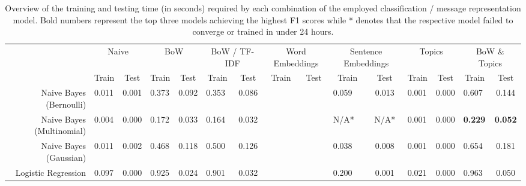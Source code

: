\documentclass[letterpaper]{article}
\begin{document}
\begin{landscape}
	\begin{table}[t!]
		\centering
		\caption{Overview of the training and testing time (in seconds) required by each combination of the employed classification / message representation model. Bold numbers represent the top three models achieving the highest F1 scores while * denotes that the respective model failed to converge or trained in under 24 hours.}
		\label{tb: time}
		\begin{tabular}{@{}r|lclclclclclclc@{}}
			\toprule
			                          & \multicolumn{2}{c}{Naive}         & \multicolumn{2}{c}{BoW}           & \multicolumn{2}{c}{BoW / TF-IDF}  & \multicolumn{2}{c}{Word Embeddings} & \multicolumn{2}{c}{Sentence Embeddings} & \multicolumn{2}{c}{Topics}             & \multicolumn{2}{c}{BoW \& Topics}            \\
			\multicolumn{1}{l|}{}     & \multicolumn{1}{c}{Train} & Test  & \multicolumn{1}{c}{Train} & Test  & \multicolumn{1}{c}{Train} & Test  & \multicolumn{1}{c}{Train} & Test    & \multicolumn{1}{c}{Train}     & Test    & \multicolumn{1}{c}{Train}    & Test    & \multicolumn{1}{c}{Train}    & Test          \\ \midrule
			Naive Bayes (Bernoulli)   & 0.011                     & 0.001 & 0.373                     & 0.092 & 0.353                     & 0.086 &                           &         & 0.059                         & 0.013   & 0.001                        & 0.000   & 0.607                        & 0.144         \\
			Naive Bayes (Multinomial) & 0.004                     & 0.000 & 0.172                     & 0.033 & 0.164                     & 0.032 &                           &         & N/A*                          &  N/A*   & 0.001                        & 0.000   & \textbf{0.229}               & \textbf{0.052}\\
			Naive Bayes (Gaussian)    & 0.011                     & 0.002 & 0.468                     & 0.118 & 0.500                     & 0.126 &                           &         & 0.038                         & 0.008   & 0.001                        & 0.000   & 0.654                        & 0.181         \\
			Logistic Regression       & 0.097                     & 0.000 & 0.925                     & 0.024 & 0.901                     & 0.032 &                           &         & 0.200                         & 0.001   & 0.021                        & 0.000   & 0.963                        & 0.050         \\

\end{tabular}
\end{table}
\end{landscape}
\end{document}
